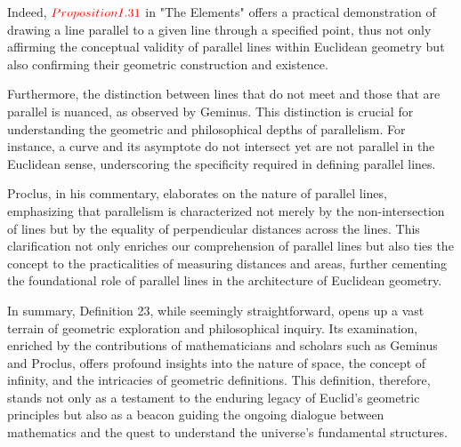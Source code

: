 Indeed, $\textcolor{red}{Proposition I.31}$ in "The Elements" offers a practical demonstration of drawing a line parallel to a given line through a specified point, thus not only affirming the conceptual validity of parallel lines within Euclidean geometry but also confirming their geometric construction and existence.

Furthermore, the distinction between lines that do not meet and those that are parallel is nuanced, as observed by Geminus. This distinction is crucial for understanding the geometric and philosophical depths of parallelism. For instance, a curve and its asymptote do not intersect yet are not parallel in the Euclidean sense, underscoring the specificity required in defining parallel lines.

Proclus, in his commentary, elaborates on the nature of parallel lines, emphasizing that parallelism is characterized not merely by the non-intersection of lines but by the equality of perpendicular distances across the lines. This clarification not only enriches our comprehension of parallel lines but also ties the concept to the practicalities of measuring distances and areas, further cementing the foundational role of parallel lines in the architecture of Euclidean geometry.

In summary, Definition 23, while seemingly straightforward, opens up a vast terrain of geometric exploration and philosophical inquiry. Its examination, enriched by the contributions of mathematicians and scholars such as Geminus and Proclus, offers profound insights into the nature of space, the concept of infinity, and the intricacies of geometric definitions. This definition, therefore, stands not only as a testament to the enduring legacy of Euclid's geometric principles but also as a beacon guiding the ongoing dialogue between mathematics and the quest to understand the universe's fundamental structures.

\clearpage